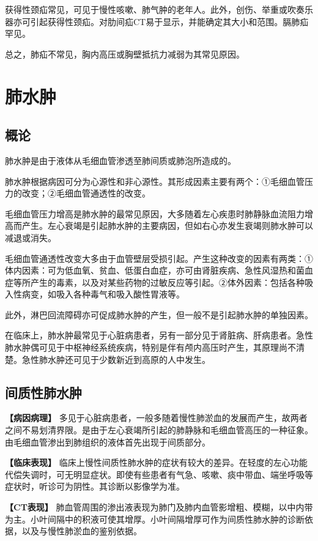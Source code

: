 获得性颈疝常见，可见于慢性咳嗽、肺气肿的老年人。此外，创伤、举重或吹奏乐器亦可引起获得性颈疝。对肋间疝CT易于显示，并能确定其大小和范围。膈肺疝罕见。

总之，肺疝不常见，胸内高压或胸壁抵抗力减弱为其常见原因。

\section{肺水肿}

\subsection{概论}

肺水肿是由于液体从毛细血管渗透至肺间质或肺泡所造成的。

肺水肿根据病因可分为心源性和非心源性。其形成因素主要有两个：①毛细血管压力的改变；②毛细血管通透性的改变。

毛细血管压力增高是肺水肿的最常见原因，大多随着左心疾患时肺静脉血流阻力增高而产生。左心衰竭是引起肺水肿的主要病因，但如右心亦发生衰竭则肺水肿可以减退或消失。

毛细血管通透性改变大多由于血管壁层受损引起。产生这种改变的因素有两类：①体内因素：可为低血氧、贫血、低蛋白血症，亦可由肾脏疾病、急性风湿热和菌血症等所产生的毒素，以及对某些药物的过敏反应等引起。②体外因素：包括各种吸入性病变，如吸入各种毒气和吸入酸性胃液等。

此外，淋巴回流障碍亦可促成肺水肿的产生，但一般不是引起肺水肿的单独因素。

在临床上，肺水肿最常见于心脏病患者，另有一部分见于肾脏病、肝病患者。急性肺水肿偶可见于中枢神经系统疾病，特别是伴有颅内高压时产生，其原理尚不清楚。急性肺水肿还可见于少数新近到高原的人中发生。

\subsection{间质性肺水肿}

\textbf{【病因病理】}
多见于心脏病患者，一般多随着慢性肺淤血的发展而产生，故两者之间不易划清界限。是由于左心衰竭所引起的肺静脉和毛细血管高压的一种征象。由毛细血管渗出到肺组织的液体首先出现于间质部分。

\textbf{【临床表现】}
临床上慢性间质性肺水肿的症状有较大的差异。在轻度的左心功能代偿失调时，可无明显症状。即使有些患者有气急、咳嗽、痰中带血、端坐呼吸等症状时，听诊可为阴性。其诊断以影像学为准。

\textbf{【CT表现】}
肺血管周围的渗出液表现为肺门及肺内血管影增粗、模糊，以中内带为主。小叶间隔中的积液可使其增厚。小叶间隔增厚可作为间质性肺水肿的诊断依据，以及与慢性肺淤血的鉴别依据。

